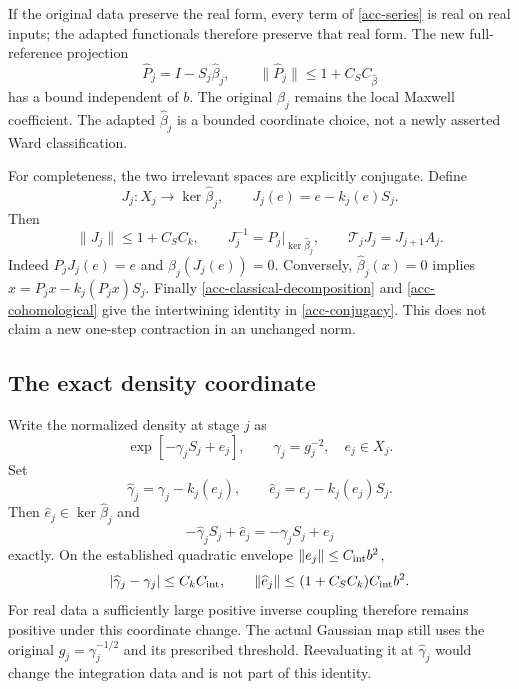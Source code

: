 If the original data preserve the real form, every term
of \eqref{acc-series} is real on real inputs; the adapted
functionals therefore preserve that real form.
The new full-reference projection
\begin{equation}
 \widehat P_j=I-S_j\widehat\beta_j,\qquad
                 \|\widehat P_j\|\le1+C_SC_{\widehat\beta}
 \label{acc-adapted-projection}
\end{equation}
has a bound independent of $b$. The original $\beta_j$
remains the local Maxwell coefficient. The adapted
$\widehat\beta_j$ is a bounded coordinate choice, not a
newly asserted Ward classification.

For completeness, the two irrelevant spaces are explicitly
conjugate. Define
\begin{equation}
 J_j:X_j\longrightarrow\ker\widehat\beta_j,\qquad
                       J_j(e)=e-k_j(e)S_j.
 \label{acc-conjugating-map}
\end{equation}
Then
\begin{equation}
 \|J_j\|\le1+C_SC_k,\qquad
 J_j^{-1}=P_j\big|_{\ker\widehat\beta_j},\qquad
                    \mathcal T_jJ_j=J_{j+1}A_j.
 \label{acc-conjugacy}
\end{equation}
Indeed $P_jJ_j(e)=e$ and
$\widehat\beta_j(J_j(e))=0$. Conversely,
$\widehat\beta_j(x)=0$ implies
$x=P_jx-k_j(P_jx)S_j$. Finally
\eqref{acc-classical-decomposition} and
\eqref{acc-cohomological} give the intertwining identity
in \eqref{acc-conjugacy}. This does not claim a new
one-step contraction in an unchanged norm.

\subsection{The exact density coordinate}
\label{acc-density-section}

Write the normalized density at stage $j$ as
\[
                  \exp[-\gamma_jS_j+e_j],
            \qquad \gamma_j=g_j^{-2},\quad e_j\in X_j.
\]
Set
\begin{equation}
 \widehat\gamma_j=\gamma_j-k_j(e_j),\qquad
                  \widehat e_j=e_j-k_j(e_j)S_j.
 \label{acc-density-coordinate}
\end{equation}
Then $\widehat e_j\in\ker\widehat\beta_j$ and
\begin{equation}
                 -\widehat\gamma_jS_j+\widehat e_j
                              =-\gamma_jS_j+e_j
 \label{acc-density-equality}
\end{equation}
exactly. On the established quadratic envelope
$\|e_j\|\le C_{\rm int}b^2$,
\begin{equation}
 |\widehat\gamma_j-\gamma_j|\le C_kC_{\rm int},\qquad
 \|\widehat e_j\|\le(1+C_SC_k)C_{\rm int}b^2.
 \label{acc-coordinate-size}
\end{equation}
For real data a sufficiently large positive inverse coupling
therefore remains positive under this coordinate change.
The actual Gaussian map still uses the original
$g_j=\gamma_j^{-1/2}$ and its prescribed threshold.
Reevaluating it at $\widehat\gamma_j$ would change the
integration data and is not part of this identity.

